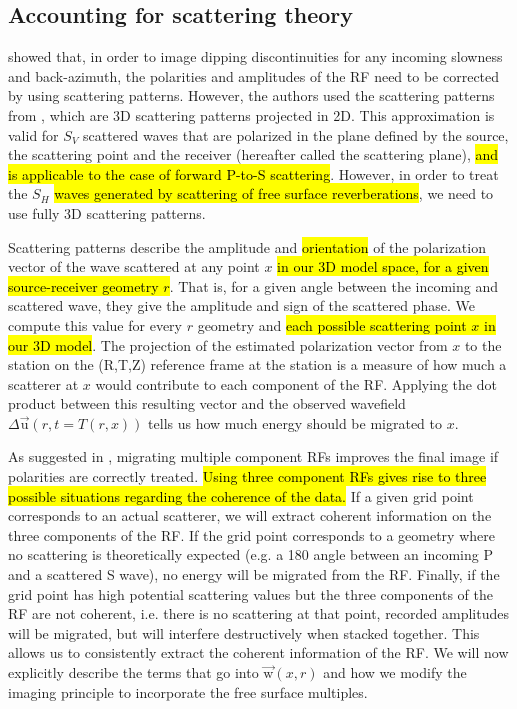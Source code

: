 \documentclass[10pt,a4paper]{article}
\begin{document}
\subsection{Accounting for scattering theory}

\citet{cheng_gji_16} showed that, in order to image dipping discontinuities for any incoming slowness and back-azimuth, the polarities and amplitudes of the RF need to be corrected by using scattering patterns.
However, the authors used the scattering patterns from \citet{rond_sgeo_09}, which are 3D scattering patterns projected in 2D. 
This approximation is valid for $S_V$ scattered waves that are polarized in the plane defined by the source, the scattering point and the receiver (hereafter called the scattering plane), \hl{and is applicable to the case of forward P-to-S scattering}.
However, in order to treat the $S_H$ \hl{waves generated by scattering of free surface reverberations}, we need to use fully 3D scattering patterns. 

Scattering patterns describe the amplitude and \hl{orientation} of the polarization vector of the wave scattered at any point $x$ \hl{in our 3D model space, for a given source-receiver geometry $r$}. 
That is, for a given angle between the incoming and scattered wave, they give the amplitude and sign of the scattered phase. %
We compute this value for every $r$ geometry and \hl{each possible scattering point $x$ in our 3D model}.
The projection of the estimated polarization vector from $x$ to the station on the (R,T,Z) reference frame at the station is a measure of how much a scatterer at $x$ would contribute to each component of the RF. 
Applying the dot product between this resulting vector and the observed wavefield $\Delta\vec{\text{u}}(r,t=T(r,x))$  tells us how much energy should be migrated to $x$.

As suggested in \citet{tone_epsl_08}, migrating multiple component RFs improves the final image if polarities are correctly treated.
\hl{Using three component RFs gives rise to three possible situations regarding the coherence of the data.}
If a given grid point corresponds to an actual scatterer, we will extract coherent information on the three components of the RF.
If the grid point corresponds to a geometry where no scattering is theoretically expected (e.g. a 180 angle between an incoming P and a scattered S wave), no energy will be migrated from the RF. 
Finally, if the grid point has high potential scattering values but the three components of the RF are not coherent, i.e. there is no scattering at that point, recorded amplitudes will be migrated, but will interfere destructively when stacked together.
This allows us to consistently extract the coherent information of the RF. 
We will now explicitly describe the terms that go into $\vec{\text{w}}(x,r)$ and how we modify the imaging principle to incorporate the free surface multiples.
\end{document}
